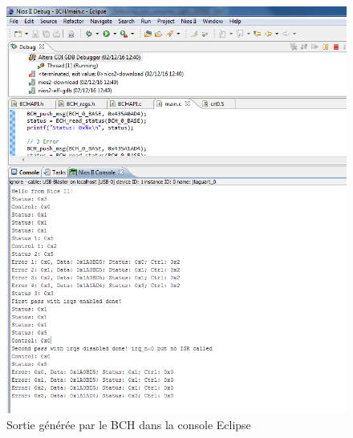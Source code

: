 \documentclass[a4paper, 11pt, svgnames]{report}
\begin{document}
        \begin{figure}[H]
            \centering
            \includegraphics[width=\textwidth]{./images/bch_output}
            \caption{Sortie générée par le BCH dans la console Eclipse}
            \label{fig:bch_output}
        \end{figure}
\end{document}
